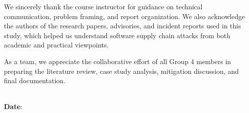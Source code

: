
\begin{acknowledgements}
We sincerely thank the course instructor for guidance on technical communication,
problem framing, and report organization. We also acknowledge the authors of the
research papers, advisories, and incident reports used in this study, which helped us
understand software supply chain attacks from both academic and practical viewpoints.

As a team, we appreciate the collaborative effort of all Group 4 members in preparing
the literature review, case study analysis, mitigation discussion, and final documentation.
 \vspace{4cm}

\begin{minipage}[b]{0.5\textwidth}
	\begin{flushleft}
		~\\ {\bf Date}:
	\end{flushleft}
\end{minipage}
\begin{minipage}[b]{0.45\textwidth}
	\begin{flushright}
		~\\
		\authorname
	 \end{flushright}
\end{minipage}

\end{acknowledgements}
